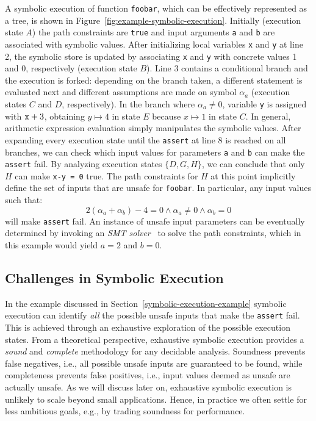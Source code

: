 \noindent A symbolic execution of function {\tt foobar}, which can be effectively represented as a tree, is shown in Figure~\ref{fig:example-symbolic-execution}. Initially (execution state $A$) the path constraints are {\tt true} and input arguments {\tt a} and {\tt b} are associated with symbolic values. 
After initializing local variables {\tt x} and {\tt y} at line 2, the symbolic store is updated by associating {\tt x} and {\tt y} with concrete values 1 and 0, respectively (execution state $B$). Line 3 contains a conditional branch and the execution is forked: depending on the branch taken, a different statement is evaluated next and different assumptions are made on symbol $\alpha_a$ (execution states $C$ and $D$, respectively). In the branch where $\alpha_a\neq 0$, variable {\tt y} is assigned with ${\tt x}+3$, obtaining $y\mapsto 4$ in state $E$ because $x\mapsto 1$ in state $C$. In general, arithmetic expression evaluation simply manipulates the symbolic values.
After expanding every execution state until the {\tt assert} at line 8 is reached on all branches, we can check which input values for parameters {\tt a} and {\tt b} can make the {\tt assert} fail. By analyzing execution states $\{D,G,H\}$, we can conclude that only $H$ can make {\tt x-y = 0} true. The path constraints for $H$ at this point implicitly define the set of inputs that are unsafe for {\tt foobar}. 
In particular, any input values such that:
 \[ 2(\alpha_a+\alpha_b)-4 = 0 \wedge \alpha_a \neq 0 \wedge \alpha_b = 0 \]
will make {\tt assert} fail. An instance of unsafe input parameters can be eventually determined by invoking an {\em SMT solver}~\cite{BKM14} to solve the path constraints, which in this example would yield $a = 2$ and $b = 0$. %


\subsection{Challenges in Symbolic Execution}
\label{example-discussion}

In the example discussed in Section~\ref{symbolic-execution-example} symbolic execution can identify {\em all} the possible unsafe inputs that make the {\tt assert} fail. This is achieved through an exhaustive exploration of the possible execution states. From a theoretical perspective, exhaustive symbolic execution provides a {\em sound} and {\em complete} methodology for any decidable analysis. Soundness prevents false negatives, i.e., all possible unsafe inputs are guaranteed to be found, while completeness prevents false positives, i.e.,  input values deemed as unsafe are actually unsafe. As we will discuss later on, exhaustive symbolic execution is unlikely to scale beyond small applications. Hence, in practice we often settle for less ambitious goals, e.g., by trading soundness for performance.

